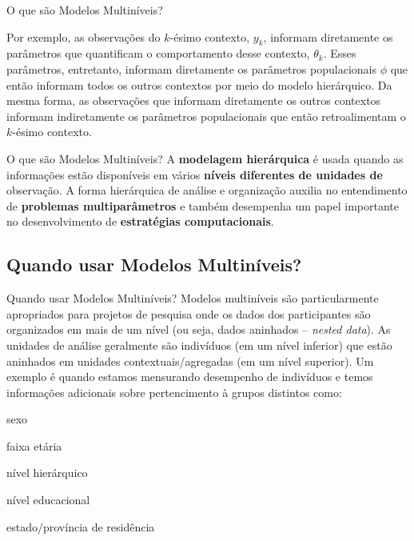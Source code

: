 \begin{frame}{O que são Modelos Multiníveis?}
\begin{adjustbox}{max width=1.0\textwidth}
	\end{adjustbox}

	\footnotesize
	Por exemplo, as observações do $k$-ésimo contexto, $y_k$, informam diretamente
	os parâmetros que quantificam o comportamento desse contexto, $\theta_k$.
	Esses parâmetros, entretanto, informam diretamente os parâmetros populacionais
	$\phi$ que então informam todos os outros contextos por meio do modelo hierárquico.
	Da mesma forma, as observações que informam diretamente os outros contextos
	informam indiretamente os parâmetros populacionais que então retroalimentam o $k$-ésimo
	contexto.
\end{frame}

\begin{frame}{O que são Modelos Multiníveis?}
	A \textbf{modelagem hierárquica} é usada quando as informações estão disponíveis em
	vários \textbf{níveis diferentes de unidades de} observação. A forma hierárquica de
	análise e organização auxilia no entendimento de \textbf{problemas multiparâmetros} e
	também desempenha um papel importante no desenvolvimento de \textbf{estratégias
		computacionais}.
\end{frame}

\subsection{Quando usar Modelos Multiníveis?}
\begin{frame}{Quando usar Modelos Multiníveis?}
	Modelos multiníveis são particularmente apropriados para projetos de pesquisa
	onde os dados dos participantes são organizados em mais de um nível
	(ou seja, dados aninhados -- \textit{nested data}).
	As unidades de análise geralmente são indivíduos (em um nível inferior)
	que estão aninhados em unidades contextuais/agregadas (em um nível superior).
	\vfill
	\small
	Um exemplo é quando estamos mensurando desempenho de indivíduos e temos
	informações adicionais sobre pertencimento à grupos distintos como:
	\begin{vfilleditems}
		\item \small sexo
		\item \small faixa etária
		\item \small nível hierárquico
		\item \small nível educacional
		\item \small estado/província de residência
	\end{vfilleditems}
\end{frame}

